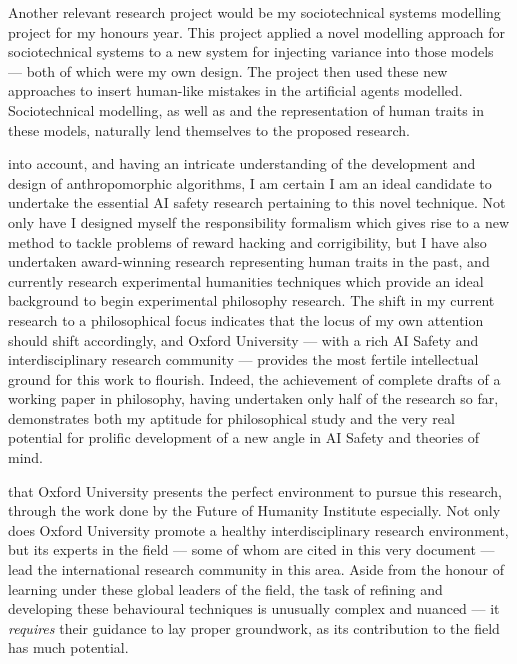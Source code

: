 Another relevant research project would be my sociotechnical systems modelling project for my honours year. This project applied a novel modelling approach for sociotechnical systems to a new system for injecting variance into those models --- both of which were my own design. The project then used these new approaches to insert human-like mistakes in the artificial agents modelled. Sociotechnical modelling, as well as and the representation of human traits in these models, naturally lend themselves to the proposed research.\par

 into account, and having an intricate understanding of the development and design of anthropomorphic algorithms, I am certain I am an ideal candidate to undertake the essential AI safety research pertaining to this novel technique. Not only have I designed myself the responsibility formalism which gives rise to a new method to tackle problems of reward hacking and corrigibility, but I have also undertaken award-winning research representing human traits in the past, and currently research experimental humanities techniques which provide an ideal background to begin experimental philosophy research. The shift in my current research to a philosophical focus indicates that the locus of my own attention should shift accordingly, and Oxford University --- with a rich AI Safety and interdisciplinary research community --- provides the most fertile intellectual ground for this work to flourish. Indeed, the achievement of complete drafts of a working paper in philosophy\cite{wallis_2016}, having undertaken only half of the research so far, demonstrates both my aptitude for philosophical study and the very real potential for prolific development of a new angle in AI Safety and theories of mind.\par

 that Oxford University presents the perfect environment to pursue this research, through the work done by the Future of Humanity Institute especially. Not only does Oxford University promote a healthy interdisciplinary research environment, but its experts in the field --- some of whom are cited in this very document --- lead the international research community in this area. Aside from the honour of learning under these global leaders of the field, the task of refining and developing these behavioural techniques is unusually complex and nuanced --- it \emph{requires} their guidance to lay proper groundwork, as its contribution to the field has much potential.\par

